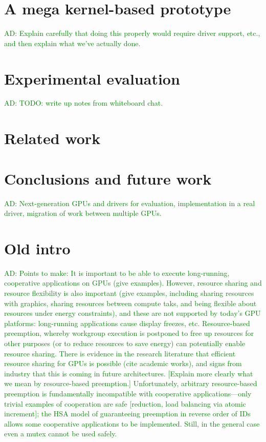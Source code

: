\documentclass[nocopyrightspace]{sigplanconf-pldi16}
\newcommand{\ADComment}[1]{\textcolor{green}{AD: #1}}
\begin{document}
\section{A mega kernel-based prototype}

\ADComment{Explain carefully that doing this properly would require
  driver support, etc., and then explain what we've actually done.}


\section{Experimental evaluation}

\ADComment{TODO: write up notes from whiteboard chat.}


\section{Related work}

\section{Conclusions and future work}

\ADComment{Next-generation GPUs and drivers for evaluation,
  implementation in a real driver, migration of work between multiple
  GPUs.}

\section{Old intro}


\ADComment{Points to make: It is important to be able to execute
  long-running, cooperative applications on GPUs (give examples).
  However, resource sharing and resource flexibility is also important
  (give examples, including sharing resources with graphics, sharing
  resources between compute taks, and being flexible about resources
  under energy constraints), and these are not supported by today's
  GPU platforms: long-running applications cause display freezes, etc.
  Resource-based preemption, whereby workgroup execution is postponed
  to free up resources for other purposes (or to reduce resources to
  save energy) can potentially enable resource sharing.  There is
  evidence in the research literature that efficient resource sharing
  for GPUs is possible (cite academic works), and signs from industry
  that this is coming in future architectures.  [Explain more clearly
    what we mean by resource-based preemption.]  Unfortunately,
  arbitrary resource-based preemption is fundamentally incompatible
  with cooperative applications---only trivial examples of cooperation
  are safe [reduction, load balancing via atomic increment]; the HSA
  model of guaranteeing preemption in reverse order of IDs allows some
  cooperative applications to be implemented.  Still, in the general
  case even a mutex cannot be used safely.}
\end{document}
